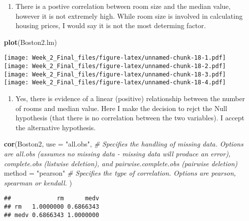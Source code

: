 \documentclass[]{article}
\newenvironment{Shaded}{\begin{snugshade}}{\end{snugshade}}
\newcommand{\KeywordTok}[1]{\textcolor[rgb]{0.13,0.29,0.53}{\textbf{#1}}}
\newcommand{\DataTypeTok}[1]{\textcolor[rgb]{0.13,0.29,0.53}{#1}}
\newcommand{\StringTok}[1]{\textcolor[rgb]{0.31,0.60,0.02}{#1}}
\newcommand{\CommentTok}[1]{\textcolor[rgb]{0.56,0.35,0.01}{\textit{#1}}}
\newcommand{\NormalTok}[1]{#1}
\providecommand{\tightlist}{%
  \setlength{\itemsep}{0pt}\setlength{\parskip}{0pt}}
\begin{document}
\begin{enumerate}
\def\labelenumi{\arabic{enumi})}
\setcounter{enumi}{6}
\tightlist
\item
  There is a postive correlation between room size and the median value,
  however it is not extremely high. While room size is involved in
  calculating housing prices, I would say it is not the most determing
  factor.
\end{enumerate}

\begin{Shaded}
\begin{Highlighting}[]
\KeywordTok{plot}\NormalTok{(Boston2.lm)}
\end{Highlighting}
\end{Shaded}

\texttt{[image: Week\_2\_Final\_files/figure-latex/unnamed-chunk-18-1.pdf]}
\texttt{[image: Week\_2\_Final\_files/figure-latex/unnamed-chunk-18-2.pdf]}
\texttt{[image: Week\_2\_Final\_files/figure-latex/unnamed-chunk-18-3.pdf]}
\texttt{[image: Week\_2\_Final\_files/figure-latex/unnamed-chunk-18-4.pdf]}

\begin{enumerate}
\def\labelenumi{\arabic{enumi})}
\setcounter{enumi}{7}
\tightlist
\item
  Yes, there is evidence of a linear (positive) relationship between the
  number of rooms and median value. Here I make the decision to rejct
  the Null hypothesis (that there is no correlation between the two
  variables). I accept the alternative hypothesis.
\end{enumerate}

\begin{Shaded}
\begin{Highlighting}[]
\KeywordTok{cor}\NormalTok{(Boston2, }
    \DataTypeTok{use =} \StringTok{"all.obs"}\NormalTok{, }\CommentTok{# Specifies the handling of missing data. Options are all.obs (assumes no missing data - missing data will produce an error), complete.obs (listwise deletion), and pairwise.complete.obs (pairwise deletion)}
    \DataTypeTok{method =} \StringTok{"pearson"} \CommentTok{# Specifies the type of correlation. Options are pearson, spearman or kendall.}
\NormalTok{      )}
\end{Highlighting}
\end{Shaded}

\begin{verbatim}
##             rm      medv
## rm   1.0000000 0.6866343
## medv 0.6866343 1.0000000
\end{verbatim}
\end{document}
